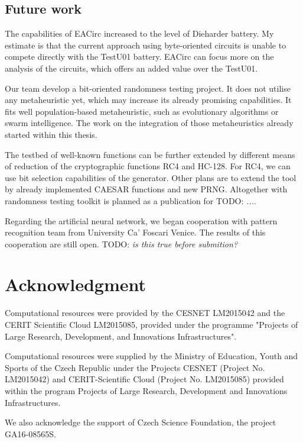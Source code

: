 \documentclass[
  print, %
  Table,   %
  nolof,     %
  nolot,     %
  11pt, %
  oneside  %
]{fithesis3}
\newcommand{\todo}[1]{TODO: \textit{#1}}
\begin{document}
\section{Future work}
\label{sec:conclusion-future}

The capabilities of EACirc increased to the level of Dieharder battery. My estimate is that the current approach using byte-oriented circuits is unable to compete directly with the TestU01 battery. EACirc can focus more on the analysis of the circuits, which offers an added value over the TestU01.

Our team develop a bit-oriented randomness testing project. It does not utilise any metaheuristic yet, which may increase its already promising capabilities. It fits well population-based metaheuristic, such as evolutionary algorithms or swarm intelligence. The work on the integration of those metaheuristics already started within this thesis.

The testbed of well-known functions can be further extended by different means of reduction of the cryptographic functions RC4 and HC-128. For RC4, we can use bit selection capabilities of the generator. Other plans are to extend the tool by already implemented CAESAR functions and new PRNG. Altogether with randomness testing toolkit is planned as a publication for \todo{...}.

Regarding the artificial neural network, we began cooperation with pattern recognition team from University Ca’ Foscari Venice. The results of this cooperation are still open. \todo{is this true before submition?}


\chapter*{Acknowledgment}
\label{chap:ack}

Computational resources were provided by the CESNET LM2015042 and the CERIT Scientific Cloud LM2015085, provided under the programme "Projects of Large Research, Development, and Innovations Infrastructures".

Computational resources were supplied by the Ministry of Education, Youth and Sports of the Czech Republic under the Projects CESNET (Project No. LM2015042) and CERIT-Scientific Cloud (Project No. LM2015085) provided within the program Projects of Large Research, Development and Innovations Infrastructures.

We also acknowledge the support of Czech Science Foundation, the project GA16-08565S.
\end{document}
